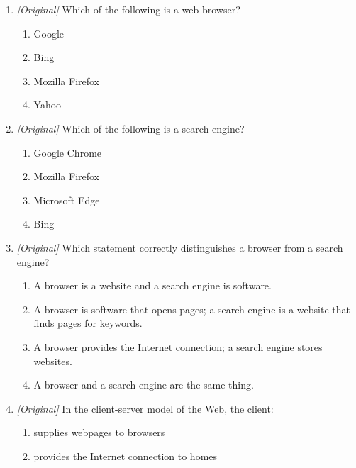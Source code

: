 \documentclass[11pt]{article}
\begin{document}
\begin{enumerate}[label=\textbf{Q\arabic*.}, leftmargin=*]
  \begin{enumerate}[label=\Alph*.]
    \item software used to open and view websites and webpages
    \item a website that finds pages for typed keywords
    \item the company that provides the Internet connection
    \item a computer that supplies pages to clients
  \end{enumerate}
\item \textit{[Original]} Which of the following is a web browser?
  \begin{enumerate}[label=\Alph*.]
    \item Google
    \item Bing
    \item Mozilla Firefox
    \item Yahoo
  \end{enumerate}
\item \textit{[Original]} Which of the following is a search engine?
  \begin{enumerate}[label=\Alph*.]
    \item Google Chrome
    \item Mozilla Firefox
    \item Microsoft Edge
    \item Bing
  \end{enumerate}
\item \textit{[Original]} Which statement correctly distinguishes a browser
  from a search engine?
  \begin{enumerate}[label=\Alph*.]
    \item A browser is a website and a search engine is software.
    \item A browser is software that opens pages; a search engine is a
      website that finds pages for keywords.
    \item A browser provides the Internet connection; a search engine stores
      websites.
    \item A browser and a search engine are the same thing.
  \end{enumerate}
\item \textit{[Original]} In the client-server model of the Web, the client:
  \begin{enumerate}[label=\Alph*.]
    \item supplies webpages to browsers
    \item provides the Internet connection to homes

\end{enumerate}
\end{enumerate}
\end{document}
